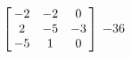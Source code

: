 {$\left[\hskip -3pt \begin{array}{ccc} -2&-2&0\\  2&-5&-3
\\  -5&1&0\end{array}\hskip -3pt \right]$} 
{$-36$}



  

